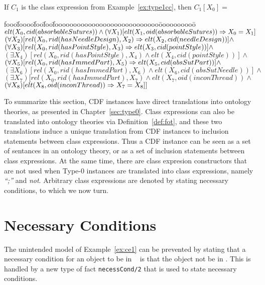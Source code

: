 \begin{example} \rm
If $C_1$ is the class expression from Example~\ref{ex:type1cc}, then
$C_1[X_0] = $
{\small
\begin{tabbing}
fooo\=foooo\=foo\=foo\=foooooooooooooooooooooooooooo\=oooooooooo\=\kill
\> $elt(X_0,cid(absorbableSutures)) \wedge (\forall X_1)
	[elt(X_1,oid(absorbableSutures)) \Rightarrow X_0 = X_1]$ \\
\> $(\forall X_2) [rel(X_0,rid(hasNeedleDesign),X_2) \Rightarrow
			elt(X_2,cid(needleDesign))] \wedge $ \\
\> $(\forall X_3) [rel(X_0,rid(hasPointStyle),X_3) \Rightarrow
			elt(X_3,cid(pointStyle))] \wedge $ \\
\> \> $(\exists X_4) [rel(X_0,rid(hasPointStyle),X_4) \wedge
			elt(X_4,cid(pointStyle))] \wedge $ \\
\> $(\forall X_5) [rel(X_0,rid(hasImmedPart),X_5) \Rightarrow
			elt(X_5,cid(absSutPart))] \wedge $ \\
\> \> $(\exists X_6) [rel(X_0,rid(hasImmedPart),X_6) \wedge
			elt(X_6,cid(absSutNeedle))] \wedge $ \\
\> \> $(\exists X_7) [rel(X_0,rid(hasImmedPart),X_7) \wedge
			elt(X_7,oid(inconThread)) \wedge $ \\
\> \> \> \> $	(\forall X_8) [elt(X_8,oid(inconThread)) \Rightarrow X_7 = X_8]] $
\end{tabbing}
}
\end{example}

To summarize this section, CDF instances have direct translations into
ontology theories, as presented in Chapter~\ref{sec:type0}.  Class
expressions can also be translated into ontology theories via
Definition~\ref{def:fot}, and these two translations induce a unique
translation from CDF instances to inclusion statements between class
expressions.  Thus a CDF instance can be seen as a set of sentances in
an ontology theory, or as a set of inclusion statements between class
expressions.  At the same time, there are class expresion constructors
that are not used when Type-0 instances are translated into class
expressions, namely {\em ``;''} and {\em not}.  Arbitrary class
expressions are denoted by stating necessary conditions, to which we
now turn.

\section{Necessary Conditions} 

The unintended model of Example~\ref{ex:ce1} can be prevented by
stating that a necessary condition for an object to be in {\tt
{}} is that the object not be in {\tt {}}.  This
is handled by a new type of fact {\tt necessCond/2} that is used to
state necessary conditions.

